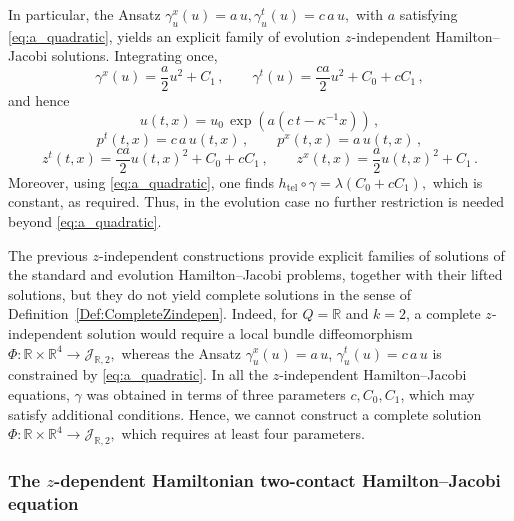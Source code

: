 \documentclass[11pt,twoside]{article}
\theoremstyle{plain}
\theoremstyle{definition}
\theoremstyle{remark}
\begin{document}
In particular, the Ansatz
\(
\gamma_u^x(u)=a\,u, \gamma_u^t(u)=c\,a\,u,
\) 
with \(a\) satisfying \eqref{eq:a_quadratic}, yields an explicit family of evolution \(z\)-independent Hamilton--Jacobi solutions. Integrating once,
\[
\gamma^x(u)=\frac{a}{2}u^2+C_1\,,\qquad
\gamma^t(u)=\frac{ca}{2}u^2+C_0+cC_1\,,
\]
and hence
\[
u(t,x)=u_0\,\exp\!\left(a(c\,t-\kappa^{-1}x)\right)\,,
\]
\[
p^t(t,x)=c\,a\,u(t,x)\,,\qquad p^x(t,x)=a\,u(t,x)\,,
\]
\[
z^t(t,x)=\frac{ca}{2}u(t,x)^2+C_0+cC_1\,,\qquad
z^x(t,x)=\frac{a}{2}u(t,x)^2+C_1\,.
\]
Moreover, using \eqref{eq:a_quadratic}, one finds
\(
h_{\mathrm{tel}}\circ\gamma=\lambda (C_0+cC_1),
\) 
which is constant, as required. Thus, in the evolution case no further restriction is needed beyond \eqref{eq:a_quadratic}.

The previous \(z\)-independent constructions provide explicit families of solutions of the standard and evolution Hamilton--Jacobi problems, together with their lifted solutions, but they do not yield complete solutions in the sense of Definition~\ref{Def:CompleteZindepen}. Indeed, for \(Q=\mathbb R\) and \(k=2\), a complete \(z\)-independent solution would require a local bundle diffeomorphism
\(
\Phi\colon \mathbb R\times \mathbb R^4\to \mathcal J_{\mathbb R,2},
\)
whereas the Ansatz \(\gamma_u^x(u)=a\,u\), \(\gamma_u^t(u)=c\,a\,u\) is constrained by \eqref{eq:a_quadratic}. In all the $z$-independent Hamilton--Jacobi equations,  $\gamma$ was obtained in terms of three parameters $c,C_0,C_1$, which may satisfy additional conditions. Hence, we cannot construct a complete solution \(
\Phi\colon \mathbb R\times \mathbb R^4\to \mathcal J_{\mathbb R,2},
\) which requires at least four parameters.

\subsubsection{The \texorpdfstring{$z$}{}-dependent Hamiltonian two-contact Hamilton--Jacobi equation}
\end{document}
